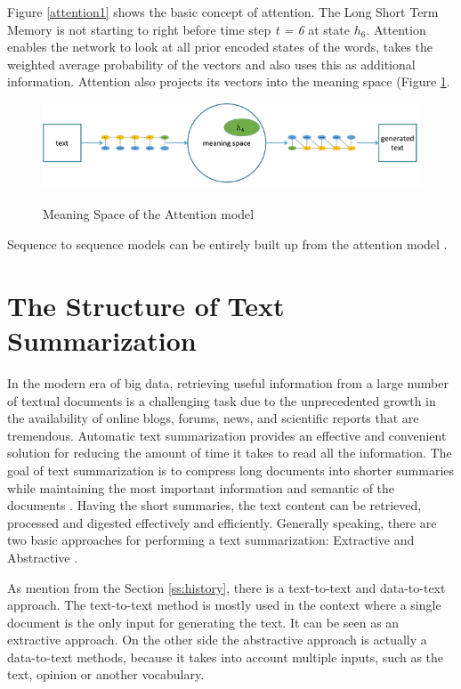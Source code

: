 Figure \ref{attention1} shows the basic concept of attention. The Long Short Term Memory is not starting to right before time step \textit{t = 6} at state \textit{\(h_{6}\)}. Attention enables the network to look at all prior encoded states of the words, takes the weighted average probability of the vectors and also uses this as additional information. Attention also projects its vectors into the meaning space (Figure \ref{meaningspace}. 

\begin{figure}
	\begin{center}
		\includegraphics[width=5in]{photos/w1-21}\\
		\caption{Meaning Space of the Attention model \cite{mugan}}\label{meaningspace}
	\end{center}
\end{figure}

Sequence to sequence models can be entirely built up from the attention model \cite{attention2}. 

\section{The Structure of Text Summarization}

In the modern era of big data, retrieving useful information from a large number of textual documents is a challenging task due to the unprecedented growth in the availability of online blogs, forums, news, and scientific reports that are tremendous. Automatic text summarization provides an effective and convenient solution for reducing the amount of time it takes to read all the information. The goal of text summarization is to compress long documents into shorter summaries while maintaining the most important information and semantic of the documents \cite{ts-intro} \cite{ts-intro2}. Having the short summaries, the text content can be retrieved, processed and digested effectively and efficiently. 
Generally speaking, there are two basic approaches for performing a text summarization: Extractive and Abstractive \cite{ts-intro3}. 

As mention from the Section \ref{ss:history}, there is a text-to-text and data-to-text approach. The text-to-text method is mostly used in the context where a single document is the only input for generating the text. It can be seen as an extractive approach.  On the other side the abstractive approach is actually a data-to-text methods, because it takes into account multiple inputs, such as the text, opinion or another vocabulary.

